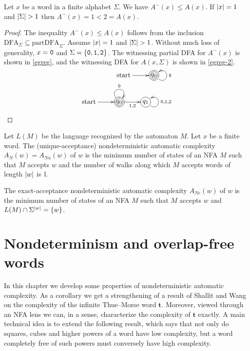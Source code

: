 		\begin{theorem}\label{dec13-2022-II}
			Let $x$ be a word in a finite alphabet $\Sigma$. We have $A^-(x)\le A(x)$.
			If $\lvert x\rvert=1$ and $\lvert\Sigma\rvert>1$ then $A^-(x)=1<2=A(x)$.
		\end{theorem}
		\begin{proof}
			The inequality $A^-(x)\le A(x)$ follows from the inclusion $\mathrm{DFA}_\Sigma\subseteq\mathrm{partDFA}_\Sigma$.
			Assume $\lvert x\rvert=1$ and $\lvert\Sigma\rvert>1$. Without much loss of generality, $x=\mathtt 0$ and $\Sigma=\{\mathtt 0, \mathtt 1, \mathtt 2\}$.
			The witnessing partial DFA for $A^-(x)$ is shown in \eqref{egreg},
			and the witnessing DFA for $A(x,\Sigma)$ is shown in \eqref{egreg-2}.
			\begin{eqnarray}
				\begin{gathered}\label{egreg}
				\xymatrix{
					\text{start}\ar[r] & *+[Foo]{q_0}\ar@(dr,ur)_{\mt{0}}
				}
				\end{gathered}\\
				\begin{gathered}\label{egreg-2}
				\xymatrix{
					\text{start}\ar[r] & *+[Foo]{q_0}\ar@(ul,ur)^{\mt 0}\ar[r]_{\mt{1}, \mt{2}} & *+[Fo]{q_1}\ar@(dr,ur)_{\mt{0},\mt{1},\mt{2}}
				}
				\end{gathered}
			\end{eqnarray}
		\end{proof}
		\begin{definition}[{\cite{MR3386523,MR1897300}}]\label{df:A_N}
			Let $L(M)$ be the language recognized by the automaton $M$.
			Let $x$ be a finite word.
			The (unique-acceptance) nondeterministic automatic complexity
			$A_N(w)=A_{Nu}(w)$ of $w$ is
			the minimum number of states of an NFA $M$
			such that $M$ accepts $w$ and the number of walks
			along which $M$ accepts words of length $\lvert w\rvert$ is 1.

			The exact-acceptance nondeterministic automatic complexity
			$A_{Ne}(w)$ of $w$ is
			the minimum number of states of an NFA $M$
			such that $M$ accepts $w$ and $L(M)\cap\Sigma^{\lvert w\rvert}=\{w\}$.
		\end{definition}


\chapter{Nondeterminism and overlap-free words}\label{chap:EJC}

	
	In this chapter we develop some properties of nondeterministic automatic complexity.
	As a corollary we get a strengthening of a result of Shallit and Wang~\cite{MR1897300}
	on the complexity of the infinite Thue--Morse word $\mathbf t$.
	Moreover, viewed through an NFA lens we can, in a sense, characterize the complexity of $\mathbf t$ exactly.
	A main technical idea is to extend the following result, which says that not only do squares, cubes and higher powers of a word have low complexity,
	but a word completely free of such powers must conversely have high complexity.

